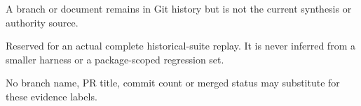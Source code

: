 \begin{statusbox}{}
A branch or document remains in Git history but is not the current synthesis or authority source.
\end{statusbox}

\begin{statusbox}{}
Reserved for an actual complete historical-suite replay. It is never inferred from a smaller harness or a package-scoped regression set.
\end{statusbox}

No branch name, PR title, commit count or merged status may substitute for these evidence labels.
